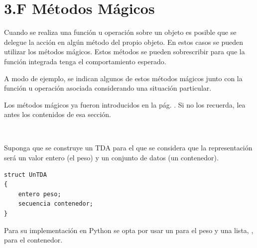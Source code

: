 
\section*{3.F Métodos Mágicos}

Cuando se realiza una función u operación sobre un objeto es posible que se delegue la acción en algún método del propio objeto. En estos casos se pueden utilizar los métodos mágicos. Estos métodos se pueden sobrescribir para que la función integrada tenga el comportamiento esperado. 

A modo de ejemplo, se indican algunos de estos métodos mágicos junto con la función u operación asociada considerando una situación particular. 

\begin{note}
Los métodos mágicos ya fueron introducidos en  la pág. \pageref{subsec:POO}. Si no los recuerda, lea antes los contenidos de esa sección.
\end{note}

\

Suponga que se construye un TDA para el que se considera que la representación será un valor entero (el peso) y un conjunto de datos (un contenedor). 

\hfil
\begin{minipage}{.3\textwidth}
\begin{Verbatim}[frame=single]
struct UnTDA
{
    entero peso;
    secuencia contenedor;
} 
\end{Verbatim}
\end{minipage}


Para su implementación en Python se opta por usar un  para el peso y una lista, , para el contenedor.



